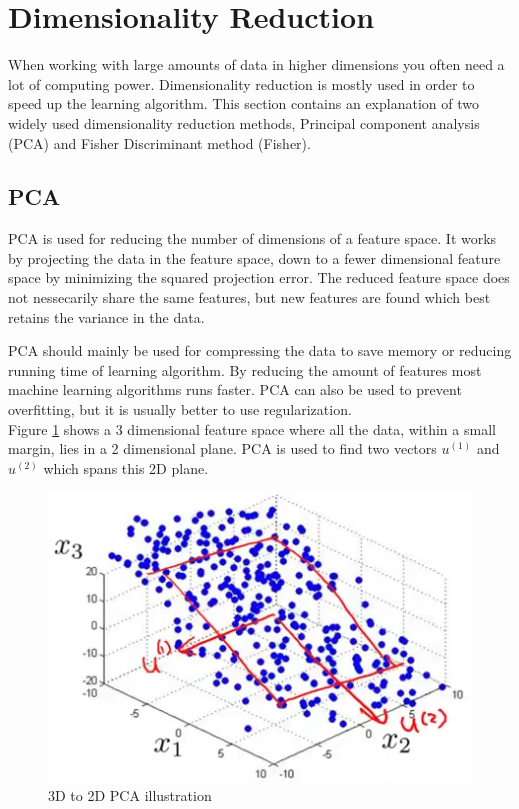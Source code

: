 
\section{Dimensionality Reduction}

When working with large amounts of data in higher dimensions you often need a lot of computing power. Dimensionality reduction is mostly used in order to speed up the learning algorithm. This section contains an explanation of two widely used dimensionality reduction methods, Principal component analysis (PCA) and Fisher Discriminant method (Fisher).


\subsection{PCA}

PCA is used for reducing the number of dimensions of a feature space.
It works by projecting the data in the feature space, down to a fewer dimensional feature space by minimizing the squared projection error.
The reduced feature space does not nessecarily share the same features, but new features are found which best retains the variance in the data.

PCA should mainly be used for compressing the data to save memory or reducing running time of learning algorithm.
By reducing the amount of features most machine learning algorithms runs faster.
PCA can also be used to prevent overfitting, but it is usually better to use regularization. \\

Figure \ref{fig:pca} shows a 3 dimensional feature space where all the data, within a small margin, lies in a 2 dimensional plane.
PCA is used to find two vectors $u^{(1)}$ and $u^{(2)}$ which spans this 2D plane.

\begin{figure}
\centering
\includegraphics{images/pca}
\caption{3D to 2D PCA illustration}
\label{fig:pca}
\end{figure}

